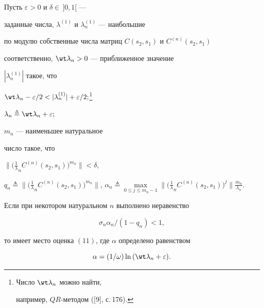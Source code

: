 \begin{thm}


Пусть $\varepsilon>0$ и $\delta\in \,]0,1[$ ---


заданные числа, $\lambda^{(1)}$ и $\lambda_n^{(1)}$ --- наибольшие


по модулю собственные числа матриц $C(s_2,s_1)$ и $C^{(n)}(s_2,s_1)$


соответственно, $\wt \lambda_n>0$  --- приближенное значение


$|\lambda_n^{(1)}|$ такое, что


$\wt\lambda_n- \varepsilon /2<| \lambda_n^{(1)}|


+\varepsilon /2;$\footnote{Число $\wt\lambda_n$ можно найти, 


например, $QR$-методом ([9], с.\,176).}


$\lambda_n\triangleq\wt\lambda_n+\varepsilon;$


$m_n$ --- наименьшее натуральное


число такое, что


$\big\|\big(\frac 1\lambda_nC^{(n)}(s_2,s_1)\big)^{m_n}\big\|<\delta$,


$q_n\triangleq\big\|\big(\frac 1\lambda_nC^{(n)}(s_2,s_1)\big)^{m_n}


\big\|$, $\alpha_n\triangleq \max\limits_{0\le j\le m_n-1}


\big\|\big(\frac 1\lambda_nC^{(n)}(s_2,s_1)\big)^j\big\|


\frac {m_n}{\lambda_n}$.


Если при некотором натуральном $n$ выполнено неравенство


\begin{equation}


\sigma_n\alpha_n/(1-q_n)<1,


\end{equation}


то имеет место оценка $(11)$, где $\alpha$ определено равенством


\begin{equation}


\alpha= (1/\omega)\ln\,(\wt \lambda_n+\varepsilon).


\end{equation}


\end{thm}





